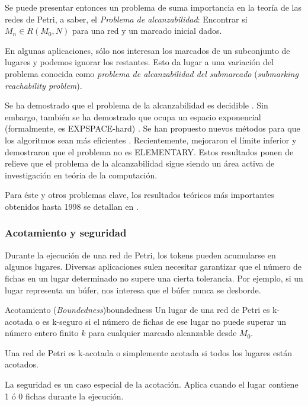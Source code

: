 Se puede presentar entonces un problema de suma importancia
en la teoría de las redes de Petri, a saber, el \emph{Problema de alcanzabilidad}:
Encontrar si $M_n \in R(M_0, N)$ para una red y un marcado inicial dados.

En algunas aplicaciones, sólo nos interesan los marcados de un subconjunto de lugares y podemos
ignorar los restantes. Esto da lugar a una variación del problema conocida como
\emph{problema de alcanzabilidad del submarcado} (\textit{submarking reachability problem}).

Se ha demostrado que el problema de la alcanzabilidad es decidible \cite{mayr1981}.
Sin embargo, también se ha demostrado que ocupa un espacio exponencial (formalmente, es
EXPSPACE-hard) \cite{lipton1976}. Se han propuesto nuevos métodos para que los algoritmos
sean más eficientes \cite{kungas2005petri}. Recientemente, \cite{czerwinski2020reachability} mejoraron el
límite inferior y demostraron que el problema no es ELEMENTARY. Estos resultados ponen de
relieve que el problema de la alcanzabilidad sigue siendo un área activa de investigación en
teória de la computación.

Para éste y otros problemas clave, los resultados teóricos más importantes obtenidos hasta
1998 se detallan en \cite{esparza1994decidability}.

\subsubsection{Acotamiento y seguridad}

Durante la ejecución de una red de Petri, los tokens pueden acumularse en algunos lugares.
Diversas aplicaciones sulen necesitar garantizar que el número de fichas en un lugar determinado no supere
una cierta tolerancia. Por ejemplo, si un lugar representa un búfer, nos interesa que el búfer
nunca se desborde.

\begin{definition}{Acotamiento (\textit{Boundedness})}{boundedness}
      Un lugar de una red de Petri es k-acotada o es k-seguro si el número de fichas
      de ese lugar no puede superar un número entero finito $k$ para cualquier marcado
      alcanzable desde $M_0$.

      Una red de Petri es k-acotada o simplemente acotada si todos los lugares están acotados.
\end{definition}

La seguridad es un caso especial de la acotación.
Aplica cuando el lugar contiene 1 ó 0 fichas durante la ejecución.

